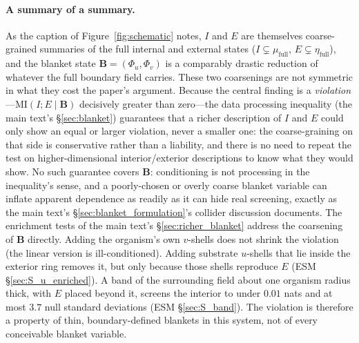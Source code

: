 \documentclass[11pt]{article}
\newcommand{\bB}{\boldsymbol{B}}
\begin{document}
\paragraph{A summary of a summary.} As the caption of Figure~\ref{fig:schematic} notes, $I$ and $E$ are themselves coarse-grained summaries of the full internal and external states ($I \subsetneq \mu_{\text{full}}$, $E \subsetneq \eta_{\text{full}}$), and the blanket state $\bB{}=(\Phi_u,\Phi_v)$ is a comparably drastic reduction of whatever the full boundary field carries. These two coarsenings are not symmetric in what they cost the paper's argument. Because the central finding is a \emph{violation}---$\mathrm{MI}(I;E\mid \bB{})$ decisively greater than zero---the data processing inequality (the main text's \S\ref{sec:blanket}) guarantees that a richer description of $I$ and $E$ could only show an equal or larger violation, never a smaller one: the coarse-graining on that side is conservative rather than a liability, and there is no need to repeat the test on higher-dimensional interior/exterior descriptions to know what they would show. No such guarantee covers $\bB{}$: conditioning is not processing in the inequality's sense, and a poorly-chosen or overly coarse blanket variable can inflate apparent dependence as readily as it can hide real screening, exactly as the main text's \S\ref{sec:blanket_formulation}'s collider discussion documents. The enrichment tests of the main text's \S\ref{sec:richer_blanket} address the coarsening of $\bB{}$ directly. Adding the organism's own $v$-shells does not shrink the violation (the linear version is ill-conditioned). Adding substrate $u$-shells that lie inside the exterior ring removes it, but only because those shells reproduce $E$ (ESM \S\ref{sec:S_u_enriched}). A band of the surrounding field about one organism radius thick, with $E$ placed beyond it, screens the interior to under $0.01$ nats and at most $3.7$ null standard deviations (ESM \S\ref{sec:S_band}). The violation is therefore a property of thin, boundary-defined blankets in this system, not of every conceivable blanket variable.
\end{document}
